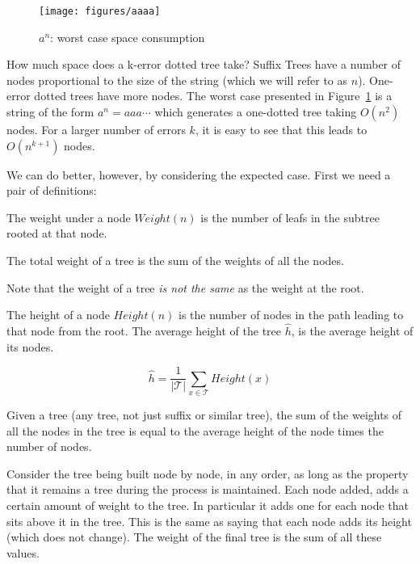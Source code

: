\begin{figure}
\texttt{[image: figures/aaaa]}
\caption{$a^n$: worst case space consumption}%
\label{fig:aaaa}
\end{figure}

How much space does a k-error dotted tree take? Suffix Trees have a number of nodes proportional to the size of the string (which we will refer to as $n$). One-error dotted trees have more nodes. The worst case presented in Figure~\ref{fig:aaaa} is a string of the form $a^n = aaa\cdots$ which generates a one-dotted tree taking $O(n^2)$ nodes. For a larger number of errors $k$, it is easy to see that this leads to $O(n^{k+1})$ nodes.

We can do better, however, by considering the expected case. First we need a pair of definitions:

\begin{definition}
The weight under a node $\mathit{Weight}(n)$ is the number of leafs in the subtree rooted at that node.

The total weight of a tree is the sum of the weights of all the nodes.
\end{definition}

Note that the weight of a tree \emph{is not the same} as the weight at the root.

\begin{definition}
The height of a node $\mathit{Height}(n)$ is the number of nodes in the path leading to that node from the root. The average height of the tree $\hat{h}$, is the average height of its nodes.

\[ \hat{h} = \frac{1}{|\mathcal{T}|} \sum_{x \in \mathit{\mathcal{T}}} \mathit{Height}(x) \]
\end{definition}

\begin{lemma}
Given a tree (any tree, not just suffix or similar tree), the sum of the weights of all the nodes in the tree is equal to the average height of the node times the number of nodes.
\end{lemma}

\Proof
Consider the tree being built node by node, in any order, as long as the property that it remains a tree during the process is maintained. Each node added, adds a certain amount of weight to the tree. In particular it adds one for each node that sits above it in the tree. This is the same as saying that each node adds its height (which does not change). The weight of the final tree is the sum of all these values.


